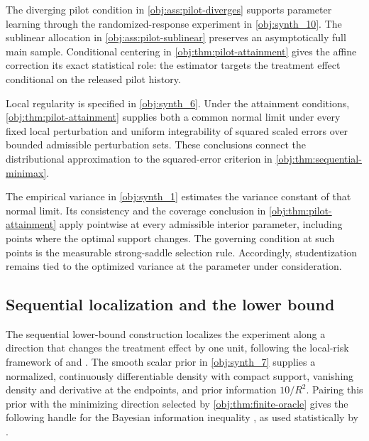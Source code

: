The diverging pilot condition in \cref{obj:ass:pilot-diverges} supports parameter learning through the randomized-response experiment in \cref{obj:synth_10}. The sublinear allocation in \cref{obj:ass:pilot-sublinear} preserves an asymptotically full main sample. Conditional centering in \cref{obj:thm:pilot-attainment} gives the affine correction its exact statistical role: the estimator targets the treatment effect conditional on the released pilot history.

Local regularity is specified in \cref{obj:synth_6}. Under the attainment conditions, \cref{obj:thm:pilot-attainment} supplies both a common normal limit under every fixed local perturbation and uniform integrability of squared scaled errors over bounded admissible perturbation sets. These conclusions connect the distributional approximation to the squared-error criterion in \cref{obj:thm:sequential-minimax}.

The empirical variance in \cref{obj:synth_1} estimates the variance constant of that normal limit. Its consistency and the coverage conclusion in \cref{obj:thm:pilot-attainment} apply pointwise at every admissible interior parameter, including points where the optimal support changes. The governing condition at such points is the measurable strong-saddle selection rule. Accordingly, studentization remains tied to the optimized variance at the parameter under consideration.

\subsection{Sequential localization and the lower bound}

The sequential lower-bound construction localizes the experiment along a direction that changes the treatment effect by one unit, following the local-risk framework of \citet[Chapter 6]{LeCam2000} and \citet[Chapters 7--8 and 25]{VanDerVaart1998}. The smooth scalar prior in \cref{obj:synth_7} supplies a normalized, continuously differentiable density with compact support, vanishing density and derivative at the endpoints, and prior information \(10/R^2\). Pairing this prior with the minimizing direction selected by \cref{obj:thm:finite-oracle} gives the following handle for the Bayesian information inequality \citep{VanTrees2001}, as used statistically by \citet[pp. 59--79]{Gill1995}.

